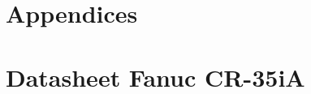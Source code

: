 \chapter*{Appendices}


\chapter{Datasheet Fanuc CR-35iA}
\label{app:datafanuc}
\begin{figure}[b]

\end{figure}